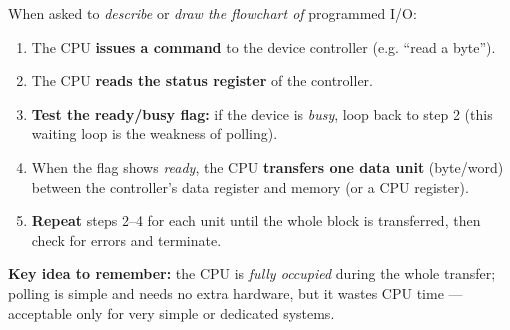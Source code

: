 \documentclass[11pt]{article}
\begin{document}
\begin{methode}
When asked to \emph{describe} or \emph{draw the flowchart of} programmed I/O:
\begin{enumerate}
\item The CPU \textbf{issues a command} to the device controller (e.g. ``read a byte'').
\item The CPU \textbf{reads the status register} of the controller.
\item \textbf{Test the ready/busy flag:} if the device is \emph{busy}, loop back to step 2 (this waiting loop is the weakness of polling).
\item When the flag shows \emph{ready}, the CPU \textbf{transfers one data unit} (byte/word) between the controller's data register and memory (or a CPU register).
\item \textbf{Repeat} steps 2--4 for each unit until the whole block is transferred, then check for errors and terminate.
\end{enumerate}
\textbf{Key idea to remember:} the CPU is \emph{fully occupied} during the whole transfer; polling is simple and needs no extra hardware, but it wastes CPU time --- acceptable only for very simple or dedicated systems.
\end{methode}
\end{document}
